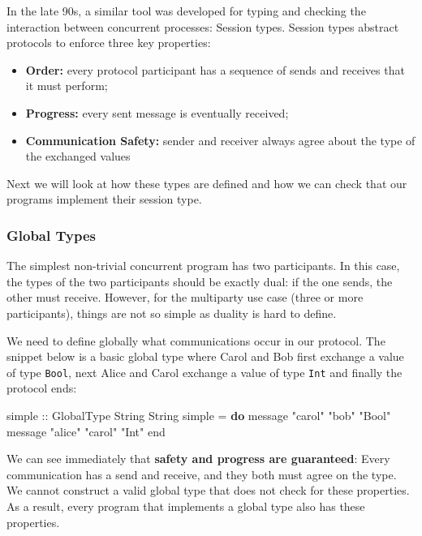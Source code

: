 \documentclass[runningheads,plain]{llncs}
\providecommand{\tightlist}{%
  \setlength{\itemsep}{0pt}\setlength{\parskip}{0pt}}
\newenvironment{Shaded}{}{}
\newcommand{\KeywordTok}[1]{\textcolor[rgb]{0.00,0.44,0.13}{\textbf{#1}}}
\newcommand{\DataTypeTok}[1]{\textcolor[rgb]{0.56,0.13,0.00}{#1}}
\newcommand{\StringTok}[1]{\textcolor[rgb]{0.25,0.44,0.63}{#1}}
\newcommand{\OtherTok}[1]{\textcolor[rgb]{0.00,0.44,0.13}{#1}}
\newcommand{\FunctionTok}[1]{\textcolor[rgb]{0.02,0.16,0.49}{#1}}
\newcommand{\NormalTok}[1]{#1}
\begin{document}
In the late 90s, a similar tool was developed for typing and checking
the interaction between concurrent processes: Session types. Session
types abstract protocols to enforce three key properties:

\begin{itemize}
\tightlist
\item
  \textbf{Order:} every protocol participant has a sequence of sends and
  receives that it must perform;
\item
  \textbf{Progress:} every sent message is eventually received;
\item
  \textbf{Communication Safety:} sender and receiver always agree about
  the type of the exchanged values
\end{itemize}

Next we will look at how these types are defined and how we can check
that our programs implement their session type.

\subsubsection{Global Types}\label{global-types}

The simplest non-trivial concurrent program has two participants. In
this case, the types of the two participants should be exactly dual: if
the one sends, the other must receive. However, for the multiparty use
case (three or more participants), things are not so simple as duality
is hard to define.

We need to define globally what communications occur in our protocol.
The snippet below is a basic global type where Carol and Bob first
exchange a value of type \texttt{Bool}, next Alice and Carol exchange a
value of type \texttt{Int} and finally the protocol ends:

\begin{Shaded}
\begin{Highlighting}[]
\OtherTok{simple ::} \DataTypeTok{GlobalType} \DataTypeTok{String} \DataTypeTok{String}
\NormalTok{simple }\FunctionTok{=} \KeywordTok{do} 
\NormalTok{    message }\StringTok{"carol"} \StringTok{"bob"} \StringTok{"Bool"}
\NormalTok{    message }\StringTok{"alice"} \StringTok{"carol"} \StringTok{"Int"}
\NormalTok{    end}
\end{Highlighting}
\end{Shaded}

We can see immediately that \textbf{safety and progress are guaranteed}:
Every communication has a send and receive, and they both must agree on
the type. We cannot construct a valid global type that does not check
for these properties. As a result, every program that implements a
global type also has these properties.
\end{document}
